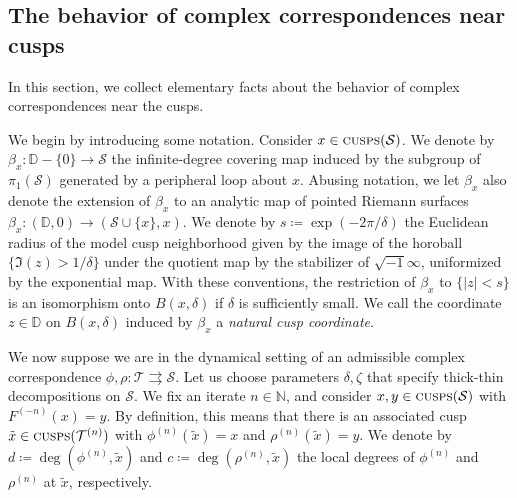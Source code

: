 \documentclass{amsart}
\newcommand\ID{{\mathbb{D}}}
\newcommand\N{{\mathbb{N}}}
\theoremstyle{definition}
\theoremstyle{remark}
\newcommand{\cT}{\mathcal{T}}
\newcommand{\cS}{\mathcal{S}}
\newcommand{\cusps}[1]{\text{\sc cusps}(#1)}
\begin{document}
\subsection{The behavior of complex correspondences near cusps}\label{subsecn:behavior}
In this section, we collect elementary facts about the behavior of complex correspondences near the cusps. 

We begin by introducing some notation.  Consider $x\in \cusps{\cS}$.  We denote by $\beta_x\colon \ID-\{0\}\to\mathcal{\cS}$ the infinite-degree covering map induced by the subgroup of $\pi_1(\mathcal{\cS})$ generated by a peripheral loop about $x$.  Abusing notation, we let $\beta_x$ also denote the extension of $\beta_x$ to an analytic map of pointed Riemann surfaces $\beta_x\colon (\ID,0)\to (\cS \cup\{x\},x)$.  We denote by $s\coloneqq\exp(-2\pi/\delta)$ the Euclidean radius of the model cusp neighborhood given by the image of the horoball $\{\Im(z)>1/\delta\}$ under the quotient map by the stabilizer of $\sqrt{-1}\infty$, uniformized by the exponential map.   With these conventions, the restriction of $\beta_x$ to $\{|z|<s\}$ is an isomorphism onto $B(x,\delta)$ if $\delta$ is sufficiently small.  We call the coordinate $z\in \ID$ on $B(x,\delta)$ induced by $\beta_x$ a \emph{natural cusp coordinate}.   

We now suppose we are in the dynamical setting of an admissible complex correspondence $\phi, \rho\colon \cT \rightrightarrows\cS$.  Let us choose parameters $\delta, \zeta$ that specify thick-thin decompositions on $\cS$.  We fix an iterate $n\in \N$, and consider $x, y\in \cusps{\cS}$ with $F^{(-n)}(x)=y$.  By definition, this means that there is an associated cusp $\tilde{x}\in \cusps{\cT^{(n)}}$ with $\phi^{(n)}(\tilde{x})=x$ and $\rho^{(n)}(\tilde{x})=y$.  We denote by $d\coloneqq\deg(\phi^{(n)},\tilde{x})$ and $c\coloneqq\deg(\rho^{(n)},\tilde{x})$ the local degrees of $\phi^{(n)}$ and $\rho^{(n)}$ at $\tilde{x}$, respectively.  
\end{document}
